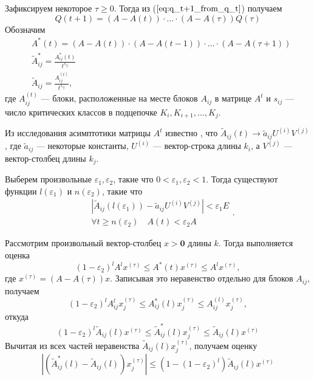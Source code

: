 \documentclass[12pt]{article}
\renewcommand{\leq}{\leqslant}
\renewcommand{\geq}{\geqslant}
\renewcommand{\epsilon}{\varepsilon}
\begin{document}
{Зафиксируем некоторое $\tau \geq 0$. Тогда из ($\ref{eq:q_t+1_from_q_t}$) получаем
\begin{equation}
\label{eq:q_t+1_from_q_tau}
	Q(t+1) = (A - A(t)) \cdot \ldots \cdot (A - A(\tau)) Q(\tau)
\end{equation}
Обозначим
\begin{equation}
	\begin{split}
		&A^*(t) = (A - A(t)) \cdot (A - A(t-1)) \cdot \ldots \cdot (A - A(\tau + 1)) \\
		&\tilde{A}^*_{ij} = \frac{A^*_{ij}(t)}{t^{s_{ij}}} \\
		&\tilde{A}_{ij} = \frac{A^{(t)}_{ij}}{t^{s_{ij}}},
	\end{split}
\end{equation}
где $A^{(t)}_{ij}$ --- блоки, расположенные на месте блоков $A_{ij}$ в матрице $A^t$ и $s_{ij}$ --- число критических классов в подцепочке $K_i, K_{i+1}, \ldots, K_j$.


Из исследования асимптотики матрицы $A^t$ известно \cite{zhiltsova-about-matrix}, что $\tilde{A}_{ij}(t) \rightarrow \tilde{a}_{ij} U^{(i)} V^{(j)}$, где $\tilde{a}_{ij}$ --- некоторые константы, $U^{(i)}$ --- вектор-строка длины $k_i$, а $V^{(j)}$ --- вектор-столбец длины $k_j$.

Выберем произвольные $\epsilon_1, \epsilon_2$, такие что $0 < \epsilon_1, \epsilon_2 < 1$. Тогда существуют функции $l(\epsilon_1)$ и $n(\epsilon_2)$, такие что
\begin{equation}
	\begin{split}
		&\left| \tilde{A}_{ij}(l(\epsilon_1)) - \tilde{a}_{ij} U^{(i)} V^{(j)} \right| < \epsilon_1 E \\
		&\forall t \geq n(\epsilon_2)\quad A(t) < \epsilon_2 A
	\end{split}.
\end{equation}

Рассмотрим произвольный вектор-столбец $x > \mathbf{0}$ длины $k$. Тогда выполняется оценка
\begin{equation}
	(1 - \epsilon_2)^l A^l x^{(\tau)} \leq A^*(t) x^{(\tau)} \leq A^l x^{(\tau)},
\end{equation}
где $x^{(\tau)} = (A - A(\tau)) x$. Записывая это неравенство отдельно для блоков $A_{ij}$, получаем
\begin{equation}
	(1 - \epsilon_2)^l A_{ij}^l x^{(\tau)}_j \leq A^*_{ij}(l) x^{(\tau)}_j \leq A^{(l)}_{ij} x^{(\tau)}_j,
\end{equation}
откуда
\begin{equation}
	(1 - \epsilon_2)^l \tilde{A}_{ij}(l) x^{(\tau)} \leq \tilde{A}^*_{ij}(l) x^{(\tau)}_j \leq \tilde{A}_{ij}(l) x^{(\tau)}
\end{equation}
Вычитая из всех частей неравенства $\tilde{A}_{ij}(l) x^{(\tau)}_j$, получаем оценку
\begin{equation}
	\left| \left( \tilde{A}^*_{ij}(l) - \tilde{A}_{ij}(l) \right) x^{(\tau)}_j \right| \leq (1 - (1 - \epsilon_2)^l) \tilde{A}_{ij}(l) x^{(\tau)}
\end{equation}

}
\end{document}
